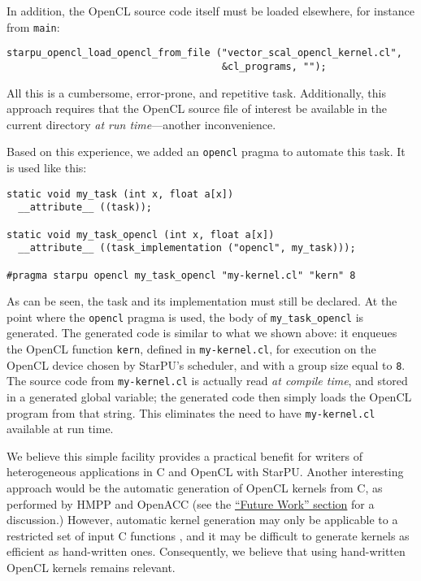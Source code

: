 \documentclass[twoside, a4paper, 10pt]{article}
\begin{document}
In addition, the OpenCL source code itself must be loaded elsewhere, for
instance from \texttt{main}:


\begin{verbatim}
starpu_opencl_load_opencl_from_file ("vector_scal_opencl_kernel.cl",
                                     &cl_programs, "");
\end{verbatim}

All this is a cumbersome, error-prone, and repetitive task.
Additionally, this approach requires that the OpenCL source file of
interest be available in the current directory \emph{at run time}---another
inconvenience.

Based on this experience, we added an \texttt{opencl} pragma to automate this
task.  It is used like this:


\begin{verbatim}
static void my_task (int x, float a[x])
  __attribute__ ((task));

static void my_task_opencl (int x, float a[x])
  __attribute__ ((task_implementation ("opencl", my_task)));

#pragma starpu opencl my_task_opencl "my-kernel.cl" "kern" 8
\end{verbatim}

As can be seen, the task and its implementation must still be declared.
At the point where the \texttt{opencl} pragma is used, the body of
\texttt{my\_task\_opencl} is generated.  The generated code is similar to what we
shown above: it enqueues the OpenCL function \texttt{kern}, defined in
\texttt{my-kernel.cl}, for execution on the OpenCL device chosen by StarPU's
scheduler, and with a group size equal to \texttt{8}.  The source code from
\texttt{my-kernel.cl} is actually read \emph{at compile time}, and stored in a
generated global variable; the generated code then simply loads the
OpenCL program from that string.  This eliminates the need to have
\texttt{my-kernel.cl} available at run time.

We believe this simple facility provides a practical benefit for writers
of heterogeneous applications in C and OpenCL with StarPU.  Another
interesting approach would be the automatic generation of OpenCL kernels
from C, as performed by HMPP \cite{dolbeau07:hmpp} and OpenACC
\cite{openacc1.0:2012} (see the \hyperref[sec-5]{``Future Work'' section} for a discussion.)
However, automatic kernel generation may only be applicable to a
restricted set of input C functions \cite{kravets2009:graphite-opencl},
and it may be difficult to generate kernels as efficient as hand-written
ones.  Consequently, we believe that using hand-written OpenCL kernels
remains relevant.
\end{document}
